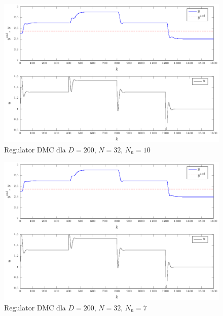 \begin{figure}[tb] 
\centering 
\includegraphics[scale=1]{rysunki/zapisz_pdf/DMC_D=200.000_N=32.00_Nu=10.00.pdf} 
\caption{Regulator DMC dla $D=200$, $N=32$, $N_{\mathrm{u}}=10$} 
\label{r_pgfplots_DMC_D=200.000_N=32.00_Nu=10.00} 
\end{figure}

\begin{figure}[tb] 
\centering 
\includegraphics[scale=1]{rysunki/zapisz_pdf/DMC_D=200.000_N=32.00_Nu=7.00.pdf} 
\caption{Regulator DMC dla $D=200$, $N=32$, $N_{\mathrm{u}}=7$} 
\label{r_pgfplots_DMC_D=200.000_N=32.00_Nu=7.00} 
\end{figure}

